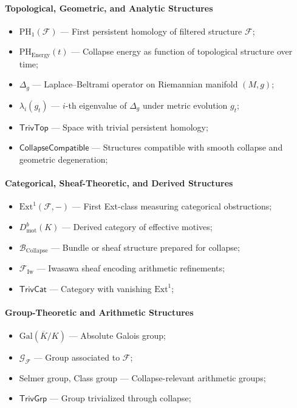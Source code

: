 \documentclass[11pt]{article}
\begin{document}
\paragraph{Topological, Geometric, and Analytic Structures}
\begin{itemize}
    \item $\mathrm{PH}_1(\mathcal{F})$ — First persistent homology of filtered structure $\mathcal{F}$;
    \item $\mathrm{PH}_{\mathrm{Energy}}(t)$ — Collapse energy as function of topological structure over time;
    \item $\Delta_g$ — Laplace--Beltrami operator on Riemannian manifold $(M, g)$;
    \item $\lambda_i(g_t)$ — $i$-th eigenvalue of $\Delta_g$ under metric evolution $g_t$;
    \item $\mathsf{TrivTop}$ — Space with trivial persistent homology;
    \item $\mathsf{CollapseCompatible}$ — Structures compatible with smooth collapse and geometric degeneration;
\end{itemize}

\paragraph{Categorical, Sheaf-Theoretic, and Derived Structures}
\begin{itemize}
    \item $\mathrm{Ext}^1(\mathcal{F}, -)$ — First Ext-class measuring categorical obstructions;
    \item $D^b_{\mathrm{mot}}(K)$ — Derived category of effective motives;
    \item $\mathcal{B}_{\mathrm{Collapse}}$ — Bundle or sheaf structure prepared for collapse;
    \item $\mathcal{F}_{\mathrm{Iw}}$ — Iwasawa sheaf encoding arithmetic refinements;
    \item $\mathsf{TrivCat}$ — Category with vanishing $\mathrm{Ext}^1$;
\end{itemize}

\paragraph{Group-Theoretic and Arithmetic Structures}
\begin{itemize}
    \item $\mathrm{Gal}(\overline{K}/K)$ — Absolute Galois group;
    \item $\mathcal{G}_{\mathcal{F}}$ — Group associated to $\mathcal{F}$;
    \item Selmer group, Class group — Collapse-relevant arithmetic groups;
    \item $\mathsf{TrivGrp}$ — Group trivialized through collapse;
\end{itemize}
\end{document}
